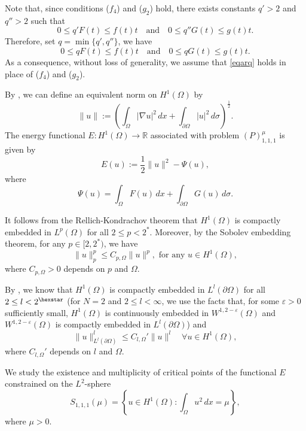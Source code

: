 \documentclass[11pt]{amsart}
\newcommand{\norm}[1]{\lVert#1\rVert}
\numberwithin{equation}{section}
\begin{document}
Note that, since conditions ($f_4$) and ($g_2$) hold, there exists constants $q'>2$ and $q''>2$ such that
\begin{equation*}
       0 \leq q'F(t)\leq f(t)t \quad \text{and} \quad 0 \leq q''G(t)\leq g(t)t.
\end{equation*}
Therefore, set $q=\min\{ q',q''\}$, we have
\begin{equation}\label{eqarq}
    0 \leq qF(t)\leq f(t)t \quad \text{and} \quad 0 \leq qG(t)\leq g(t)t.
\end{equation}
As a consequence, without loss of generality, we assume that \eqref{eqarq} holds in place of ($f_4$) and ($g_2$).

By \cite[Theorem 1.2 and Theorem 1.9 in Section 1.1]{Ne}, we can define an equivalent norm on $H^1(\Omega)$ by
$$
\|u\|:=\left(\int_{\Omega}|\nabla u|^2\,dx+ \int_{\partial \Omega}|u|^2\,d\sigma\right)^{\frac{1}{2}}.
$$
The energy functional $E: H^1(\Omega) \to \mathbb{R}$ associated with  problem $(P)^\mu_{1,1,1}$ is given by
$$
E(u) := \frac{1}{2}\norm{u}^{2}-\Psi(u),
$$
where $$
\Psi(u)=\int_\Omega  F(u)\,dx + \int_{\partial \Omega} G(u)\,d\sigma.
$$

It follows from the Rellich-Kondrachov theorem that $H^1(\Omega)$ is compactly embedded in $L^p(\Omega)$ for all $2\leq p<2^*$.  Moreover, by the Sobolev embedding theorem, for any $p \in [2, 2^*)$, we have
\begin{equation}\label{eqgnh1}
    \|u\|_p^p \leq C_{p,\Omega} \| u\|^{p}, \,\,\text{for any}\,\, u \in  H^1(\Omega),
\end{equation}
where $ C_{p,\Omega} > 0$ depends on $p$ and $\Omega$.

By \cite[Theorem 6.2 in Section 2.6]{Ne}, we know that $H^1(\Omega)$ is compactly embedded in $L^l(\partial \Omega)$ for all $2\leq l<2^{\hexstar}$ (for $N=2$ and $2\leq l<\infty$,  we use the facts that, for some $\varepsilon>0$ sufficiently small, $H^1(\Omega)$ is continuously embedded in $W^{1,2-\varepsilon}(\Omega)$ and $W^{1,2-\varepsilon}(\Omega)$ is compactly embedded in $L^l(\partial \Omega)$) and
\begin{equation}
  \label{eqsi}
    \|u\|_{L^l(\partial\Omega)}^l \leq C_{l,\Omega}' \|u\|^{l} \quad \forall u \in  H^1(\Omega),
\end{equation}
where $C_{l,\Omega}'$ depends on $l$ and $\Omega$.

We study the existence and multiplicity of critical points of the functional $E$ constrained on the $L^2$-sphere$$S_{1,1,1}(\mu)= \left\{ u \in H^1(\Omega):\int_\Omega u^2\,dx = \mu \right\},$$where $\mu > 0$.
\end{document}
